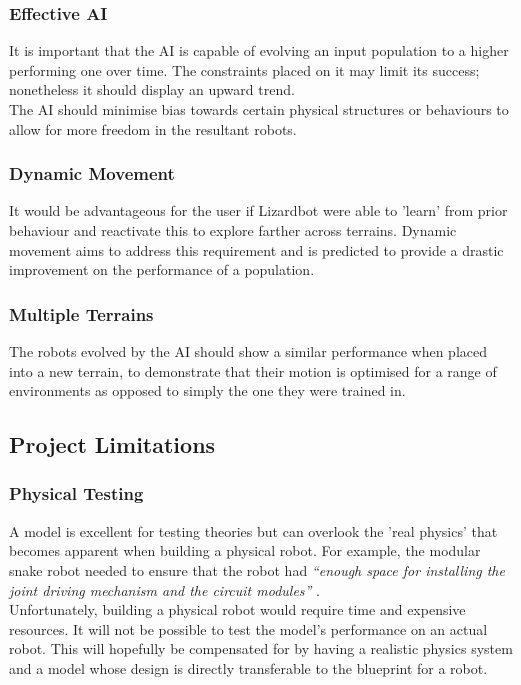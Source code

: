 \documentclass{article}
\begin{document}
\subsubsection{Effective AI}
\label{sec:Effective AI}
It is important that the AI is capable of evolving an input population to a higher performing one over time. The constraints placed on it may limit its success; nonetheless it should display an upward trend.\\ The AI should minimise bias towards certain physical structures or behaviours to allow for more freedom in the resultant robots. 

\subsubsection{Dynamic Movement}
\label{sec:Dynamic Movement Req}
It would be advantageous for the user if Lizardbot were able to 'learn' from prior behaviour and reactivate this to explore farther across terrains. Dynamic movement aims to address this requirement and is predicted to provide a drastic improvement on the performance of a population.

\subsubsection{Multiple Terrains}
\label{sec:Multiple Terrains}
The robots evolved by the AI should show a similar performance when placed into a new terrain, to demonstrate that their motion is optimised for a range of environments as opposed to simply the one they were trained in.

\subsection{Project Limitations}
\label{sec:Non-functional Requirements}
\subsubsection{Physical Testing}
\label{sec:Physical Testing}
A model is excellent for testing theories but can overlook the 'real physics' that becomes apparent when building a physical robot. For example, the modular snake robot needed to ensure that the robot had \textit{“enough space for installing the joint driving mechanism and the circuit modules”} . \\
Unfortunately, building a physical robot would require time and expensive resources. It will not be possible to test the model’s performance on an actual robot. This will hopefully be compensated for by having a realistic physics system and a model whose design is directly transferable to the blueprint for a robot.
\end{document}
